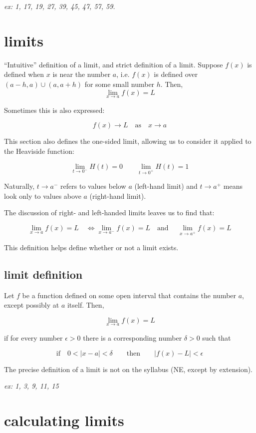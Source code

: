 \documentclass[10pt,a4paper]{report}
\begin{document}
\emph{ex: 1, 17, 19, 27, 39, 45, 47, 57, 59.}

\section{limits}
``Intuitive'' definition of a limit, and strict definition of a limit.
Suppose $f(x)$ is defined when $x$ is near the number $a$, i.e. $f(x)$ is defined over $(a - h, a) \cup (a, a + h)$ for some small number $h$. Then,
$$
	\lim_{x \to a} f(x) = L
$$

Sometimes this is also expressed:

$$
	f(x) \to L \quad \text{as} \quad x \to a
$$

This section also defines the one-sided limit, allowing us to consider it applied to the Heaviside function:

$$
	\lim_{t \to 0^-} H(t) = 0 \qquad
	\lim_{t \to 0^+} H(t) = 1
$$

Naturally, $t \to a^-$ refers to values below $a$ (left-hand limit) and $t \to a^+$ means look only to values above $a$ (right-hand limit).

The discussion of right- and left-handed limits leaves us to find that:

$$
	\lim_{x \to a} f(x) = L \quad \iff \lim_{x \to a^-} f(x) = L \quad \text{and } \quad \lim_{x \to a^+} f(x) = L
$$

This definition helps define whether or not a limit exists.



\subsection{limit definition}

Let $f$ be a function defined on some open interval that contains the number $a$, except possibly at $a$ itself. Then,

$$
	\lim_{x \to a} f(x) = L
$$

if for every number $\epsilon > 0$ there is a corresponding number $\delta > 0$ such that

$$
	\text{if} \quad 0 < |x - a| < \delta \qquad \text{then} \qquad |f(x) - L| < \epsilon
$$

The precise definition of a limit is not on the syllabus (NE, except by extension).

\emph{ex: 1, 3, 9, 11, 15}

\section{calculating limits}
\end{document}
